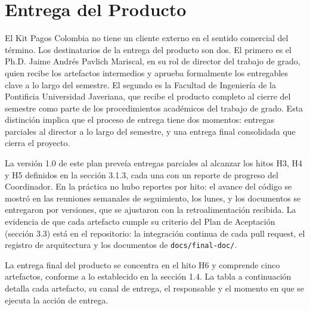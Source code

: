 \section{Entrega del Producto}

El Kit Pagos Colombia no tiene un cliente externo en el sentido comercial del término. Los destinatarios de la entrega del producto son dos. El primero es el Ph.D. Jaime Andrés Pavlich Mariscal, en su rol de director del trabajo de grado, quien recibe los artefactos intermedios y aprueba formalmente los entregables clave a lo largo del semestre. El segundo es la Facultad de Ingeniería de la Pontificia Universidad Javeriana, que recibe el producto completo al cierre del semestre como parte de los procedimientos académicos del trabajo de grado. Esta distinción implica que el proceso de entrega tiene dos momentos: entregas parciales al director a lo largo del semestre, y una entrega final consolidada que cierra el proyecto.

La versión 1.0 de este plan preveía entregas parciales al alcanzar los hitos H3, H4 y H5 definidos en la sección 3.1.3, cada una con un reporte de progreso del Coordinador. En la práctica no hubo reportes por hito: el avance del código se mostró en las reuniones semanales de seguimiento, los lunes, y los documentos se entregaron por versiones, que se ajustaron con la retroalimentación recibida. La evidencia de que cada artefacto cumple su criterio del Plan de Aceptación (sección 3.3) está en el repositorio: la integración continua de cada pull request, el registro de arquitectura y los documentos de \texttt{docs/final-doc/}.

La entrega final del producto se concentra en el hito H6 y comprende cinco artefactos, conforme a lo establecido en la sección 1.4. La tabla a continuación detalla cada artefacto, su canal de entrega, el responsable y el momento en que se ejecuta la acción de entrega.

